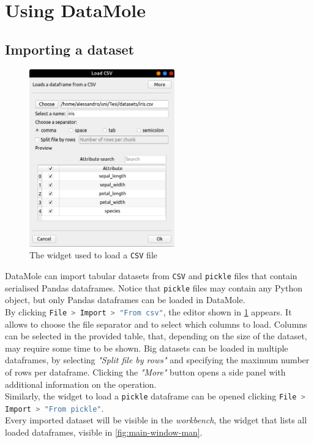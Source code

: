 \section{Using DataMole}

\subsection{Importing a dataset}
\begin{figure}
	\centering
	\includegraphics[width=0.56\textwidth]{load-csv}
	\caption{The widget used to load a \texttt{CSV} file}
	\label{fig:load-csv}
\end{figure}
DataMole can import tabular datasets from \texttt{CSV} and \texttt{pickle} files that contain serialised Pandas dataframes. Notice that \texttt{pickle} files may contain any Python object, but only Pandas dataframes can be loaded in DataMole.\\
By clicking \lstinline[language=bash]|File > Import > "From csv"|, the editor shown in \cref{fig:load-csv} appears. It allows to choose the file separator and to select which columns to load. Columns can be selected in the provided table, that, depending on the size of the dataset, may require some time to be shown. Big datasets can be loaded in multiple dataframes, by selecting \textit{"Split file by rows"} and specifying the maximum number of rows per dataframe. Clicking the \textit{"More"} button opens a side panel with additional information on the operation.\\
Similarly, the widget to load a \texttt{pickle} dataframe can be opened clicking \lstinline[language=bash]|File > Import > "From pickle"|.\\
Every imported dataset will be visible in the \textit{workbench}, the widget that lists all loaded dataframes, visible in \cref{fig:main-window-man}.

